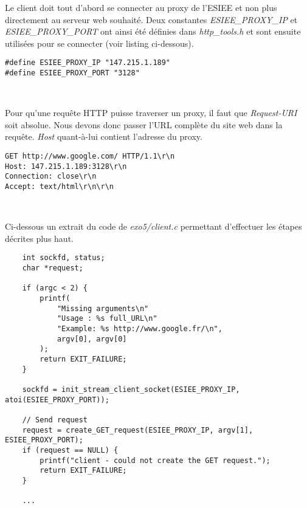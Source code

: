 \documentclass[a4paper, frenchb, 11pt]{article}
\begin{document}
Le client doit tout d'abord se connecter au proxy de l'ESIEE et non plus directement au serveur web souhaité. Deux constantes \emph{ESIEE\_PROXY\_IP} et \emph{ESIEE\_PROXY\_PORT} ont ainsi été définies dans \emph{http\_tools.h} et sont ensuite utilisées pour se connecter (voir listing ci-dessous).

\begin{lstlisting}[caption=Extrait de http\_tools.h]
#define ESIEE_PROXY_IP "147.215.1.189"
#define ESIEE_PROXY_PORT "3128"
\end{lstlisting}
\

Pour qu'une requête HTTP puisse traverser un proxy, il faut que \emph{Request-URI} soit absolue. Nous devons donc passer l'URL complète du site web dans la requête. \emph{Host} quant-à-lui contient l'adresse du proxy.

\begin{lstlisting}[caption=Exemple de requête en passant par le proxy de l'ESIEE]
GET http://www.google.com/ HTTP/1.1\r\n
Host: 147.215.1.189:3128\r\n
Connection: close\r\n
Accept: text/html\r\n\r\n
\end{lstlisting}
\

\noindent Ci-dessous un extrait du code de \emph{exo5/client.c} permettant d'effectuer les étapes décrites plus haut.

\begin{lstlisting}
    int sockfd, status;
    char *request;

    if (argc < 2) {
        printf(
            "Missing arguments\n"
            "Usage : %s full_URL\n"
            "Example: %s http://www.google.fr/\n",
            argv[0], argv[0]
        );
        return EXIT_FAILURE;
    }

    sockfd = init_stream_client_socket(ESIEE_PROXY_IP, atoi(ESIEE_PROXY_PORT));

    // Send request
    request = create_GET_request(ESIEE_PROXY_IP, argv[1], ESIEE_PROXY_PORT);
    if (request == NULL) {
        printf("client - could not create the GET request.");
        return EXIT_FAILURE;
    }

    ...
\end{lstlisting}


\newpage

\renewcommand\refname{Ressources utilisées}
\begin{thebibliography}{5} %
\end{thebibliography}
\end{document}
